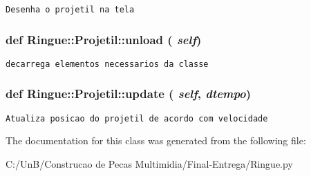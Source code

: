 \begin{footnotesize}\begin{verbatim}Desenha o projetil na tela \end{verbatim}
\end{footnotesize}
 \hypertarget{class_ringue_1_1_projetil_a3fb7d6b9b2c544691ac58c3b528e207}{
\subsubsection[{unload}]{\setlength{\rightskip}{0pt plus 5cm}def Ringue::Projetil::unload ( {\em self})}}
\label{class_ringue_1_1_projetil_a3fb7d6b9b2c544691ac58c3b528e207}




\begin{footnotesize}\begin{verbatim}decarrega elementos necessarios da classe \end{verbatim}
\end{footnotesize}
 \hypertarget{class_ringue_1_1_projetil_790565deda378720a1665e7a1033ddb8}{
\subsubsection[{update}]{\setlength{\rightskip}{0pt plus 5cm}def Ringue::Projetil::update ( {\em self}, \/   {\em dtempo})}}
\label{class_ringue_1_1_projetil_790565deda378720a1665e7a1033ddb8}




\begin{footnotesize}\begin{verbatim}Atualiza posicao do projetil de acordo com velocidade \end{verbatim}
\end{footnotesize}
 

The documentation for this class was generated from the following file:\begin{CompactItemize}
\item 
C:/UnB/Construcao de Pecas Multimidia/Final-Entrega/Ringue.py\end{CompactItemize}
